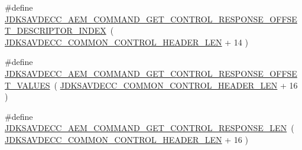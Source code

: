 \begin{DoxyCompactItemize}
\#define \hyperlink{group__command__get__control__response_ga9d9b134aa2ce6a8cb500a9db60445fc6}{J\+D\+K\+S\+A\+V\+D\+E\+C\+C\+\_\+\+A\+E\+M\+\_\+\+C\+O\+M\+M\+A\+N\+D\+\_\+\+G\+E\+T\+\_\+\+C\+O\+N\+T\+R\+O\+L\+\_\+\+R\+E\+S\+P\+O\+N\+S\+E\+\_\+\+O\+F\+F\+S\+E\+T\+\_\+\+D\+E\+S\+C\+R\+I\+P\+T\+O\+R\+\_\+\+I\+N\+D\+EX}~( \hyperlink{group__jdksavdecc__avtp__common__control__header_gaae84052886fb1bb42f3bc5f85b741dff}{J\+D\+K\+S\+A\+V\+D\+E\+C\+C\+\_\+\+C\+O\+M\+M\+O\+N\+\_\+\+C\+O\+N\+T\+R\+O\+L\+\_\+\+H\+E\+A\+D\+E\+R\+\_\+\+L\+EN} + 14 )
\item 
\#define \hyperlink{group__command__get__control__response_gad5260aafd875b20d7705f8cca7387cd6}{J\+D\+K\+S\+A\+V\+D\+E\+C\+C\+\_\+\+A\+E\+M\+\_\+\+C\+O\+M\+M\+A\+N\+D\+\_\+\+G\+E\+T\+\_\+\+C\+O\+N\+T\+R\+O\+L\+\_\+\+R\+E\+S\+P\+O\+N\+S\+E\+\_\+\+O\+F\+F\+S\+E\+T\+\_\+\+V\+A\+L\+U\+ES}~( \hyperlink{group__jdksavdecc__avtp__common__control__header_gaae84052886fb1bb42f3bc5f85b741dff}{J\+D\+K\+S\+A\+V\+D\+E\+C\+C\+\_\+\+C\+O\+M\+M\+O\+N\+\_\+\+C\+O\+N\+T\+R\+O\+L\+\_\+\+H\+E\+A\+D\+E\+R\+\_\+\+L\+EN} + 16 )
\item 
\#define \hyperlink{group__command__get__control__response_ga7710c107343ebf9ecac1875dc8fb59e3}{J\+D\+K\+S\+A\+V\+D\+E\+C\+C\+\_\+\+A\+E\+M\+\_\+\+C\+O\+M\+M\+A\+N\+D\+\_\+\+G\+E\+T\+\_\+\+C\+O\+N\+T\+R\+O\+L\+\_\+\+R\+E\+S\+P\+O\+N\+S\+E\+\_\+\+L\+EN}~( \hyperlink{group__jdksavdecc__avtp__common__control__header_gaae84052886fb1bb42f3bc5f85b741dff}{J\+D\+K\+S\+A\+V\+D\+E\+C\+C\+\_\+\+C\+O\+M\+M\+O\+N\+\_\+\+C\+O\+N\+T\+R\+O\+L\+\_\+\+H\+E\+A\+D\+E\+R\+\_\+\+L\+EN} + 16 )
\end{DoxyCompactItemize}
